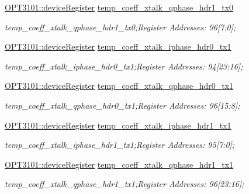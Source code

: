 \begin{DoxyCompactItemize}
\mbox{\hyperlink{class_o_p_t3101_1_1device_register}{O\+P\+T3101\+::device\+Register}} \mbox{\hyperlink{class_o_p_t3101_1_1registers_a23ed1ca5150b80c321433123e0b518c7}{temp\+\_\+coeff\+\_\+xtalk\+\_\+qphase\+\_\+hdr1\+\_\+tx0}}
\begin{DoxyCompactList}\small\item\em temp\+\_\+coeff\+\_\+xtalk\+\_\+qphase\+\_\+hdr1\+\_\+tx0;Register Addresses\+: 96\mbox{[}7\+:0\mbox{]}; \end{DoxyCompactList}\item 
\mbox{\hyperlink{class_o_p_t3101_1_1device_register}{O\+P\+T3101\+::device\+Register}} \mbox{\hyperlink{class_o_p_t3101_1_1registers_a2dff104599587cc06b51acc7dbf06270}{temp\+\_\+coeff\+\_\+xtalk\+\_\+iphase\+\_\+hdr0\+\_\+tx1}}
\begin{DoxyCompactList}\small\item\em temp\+\_\+coeff\+\_\+xtalk\+\_\+iphase\+\_\+hdr0\+\_\+tx1;Register Addresses\+: 94\mbox{[}23\+:16\mbox{]}; \end{DoxyCompactList}\item 
\mbox{\hyperlink{class_o_p_t3101_1_1device_register}{O\+P\+T3101\+::device\+Register}} \mbox{\hyperlink{class_o_p_t3101_1_1registers_af9e734f02f4167d52f64655999810b36}{temp\+\_\+coeff\+\_\+xtalk\+\_\+qphase\+\_\+hdr0\+\_\+tx1}}
\begin{DoxyCompactList}\small\item\em temp\+\_\+coeff\+\_\+xtalk\+\_\+qphase\+\_\+hdr0\+\_\+tx1;Register Addresses\+: 96\mbox{[}15\+:8\mbox{]}; \end{DoxyCompactList}\item 
\mbox{\hyperlink{class_o_p_t3101_1_1device_register}{O\+P\+T3101\+::device\+Register}} \mbox{\hyperlink{class_o_p_t3101_1_1registers_a33bb24e516c2fb48e04788bf256465b5}{temp\+\_\+coeff\+\_\+xtalk\+\_\+iphase\+\_\+hdr1\+\_\+tx1}}
\begin{DoxyCompactList}\small\item\em temp\+\_\+coeff\+\_\+xtalk\+\_\+iphase\+\_\+hdr1\+\_\+tx1;Register Addresses\+: 95\mbox{[}7\+:0\mbox{]}; \end{DoxyCompactList}\item 
\mbox{\hyperlink{class_o_p_t3101_1_1device_register}{O\+P\+T3101\+::device\+Register}} \mbox{\hyperlink{class_o_p_t3101_1_1registers_a96e7e9ccc4101a8a7e5295f6d412e93b}{temp\+\_\+coeff\+\_\+xtalk\+\_\+qphase\+\_\+hdr1\+\_\+tx1}}
\begin{DoxyCompactList}\small\item\em temp\+\_\+coeff\+\_\+xtalk\+\_\+qphase\+\_\+hdr1\+\_\+tx1;Register Addresses\+: 96\mbox{[}23\+:16\mbox{]}; \end{DoxyCompactList}\item 

\end{DoxyCompactItemize}
